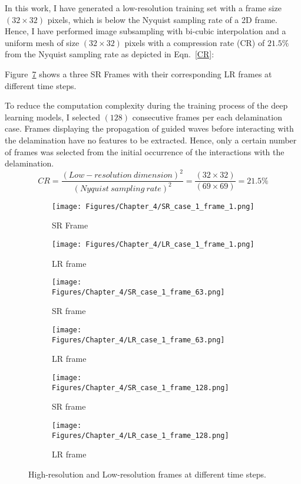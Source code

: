 In this work, I have generated a low-resolution training set with a frame size \((32\times32)\) pixels, which is below the Nyquist sampling rate of a 2D frame.
Hence, I have performed image subsampling with bi-cubic interpolation and a uniform mesh of size \((32\times32)\) pixels with a compression rate (CR) of \(21.5\%\) from the Nyquist sampling rate as depicted in Eqn.~\ref{CR}:

Figure~\ref{fig:SR_LR} shows a three SR Frames with their corresponding LR frames at different time steps.

To reduce the computation complexity during the training process of the deep learning models, I selected \((128)\) consecutive frames per each delamination case.
Frames displaying the propagation of guided waves before interacting with the delamination have no features to be extracted. 
Hence, only a certain number of frames was selected from the initial occurrence of the interactions with the delamination.
\begin{equation}
	CR = \frac{(Low-resolution\ dimension)^2}{(Nyquist\ sampling\ rate)^2} = \frac{(32\times32)}{(69\times69)}=21.5\%
	\label{CR}
\end{equation}
\begin{figure} [!h]
	\centering
	\begin{subfigure}[b]{.48\textwidth}
		\centering
		\texttt{[image: Figures/Chapter\_4/SR\_case\_1\_frame\_1.png]}
		\caption{SR Frame}
		\label{fig:SR_1}
	\end{subfigure}
	\hfill
	\begin{subfigure}[b]{.48\textwidth}
		\centering
		\texttt{[image: Figures/Chapter\_4/LR\_case\_1\_frame\_1.png]}
		\caption{LR frame}
		\label{fig:LR_1}	
	\end{subfigure}
	\hfill
	\begin{subfigure}[b]{.48\textwidth}
		\centering
		\texttt{[image: Figures/Chapter\_4/SR\_case\_1\_frame\_63.png]}
		\caption{SR frame}
		\label{fig:SR_2}
	\end{subfigure}
	\hfill
	\begin{subfigure}[b]{.48\textwidth}
		\centering
		\texttt{[image: Figures/Chapter\_4/LR\_case\_1\_frame\_63.png]}
		\caption{LR frame}
		\label{fig:LR_2}	
	\end{subfigure}
	\hfill
	\begin{subfigure}[b]{.48\textwidth}
		\centering
		\texttt{[image: Figures/Chapter\_4/SR\_case\_1\_frame\_128.png]}
		\caption{SR frame}
		\label{fig:SR_3}
	\end{subfigure}
	\hfill
	\begin{subfigure}[b]{.48\textwidth}
		\centering
		\texttt{[image: Figures/Chapter\_4/LR\_case\_1\_frame\_128.png]}
		\caption{LR frame}
		\label{fig:LR_3}	
	\end{subfigure}
	\caption{High-resolution and Low-resolution frames at different time steps.}
	\label{fig:SR_LR}
\end{figure}
\newpage

